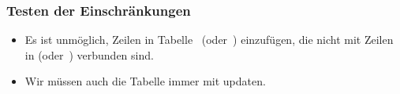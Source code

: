 \begin{frame}[t]%
\frametitle{Testen der Einschränkungen}%
\parbox{0.435\linewidth}{\small%
\begin{itemize}%
%
\item Es ist unmöglich, Zeilen in Tabelle~ (oder~) einzufügen, die nicht mit Zeilen in  (oder~) verbunden sind.%
%
\item<2-> Wir müssen auch die Tabelle  immer mit updaten.%
%
\end{itemize}%
}%
%
%
%
%
%
\end{frame}%
